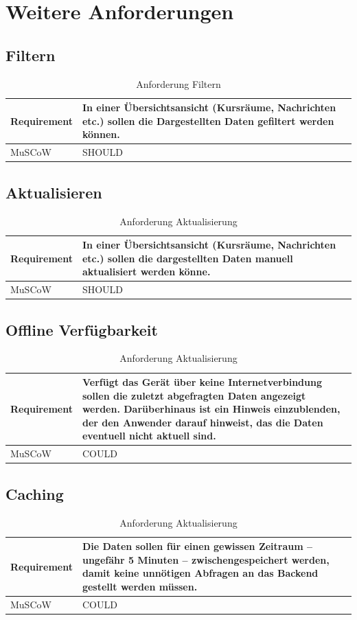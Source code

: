 \section{Weitere Anforderungen}
\subsection{Filtern}
  \begin{table}[H]
    \begin{tabular}{| a | p{12cm} |}
      \hline
      Requirement & In einer Übersichtsansicht (Kursräume, Nachrichten etc.) sollen die Dargestellten Daten gefiltert werden können. \\
      \hline
      MuSCoW & SHOULD
    \end{tabular}
  \caption{Anforderung Filtern}
  \label{requirement-filtering}
  \end{table}

\subsection{Aktualisieren}
  \begin{table}[H]
    \begin{tabular}{| a | p{12cm} |}
      \hline
      Requirement & In einer Übersichtsansicht (Kursräume, Nachrichten etc.) sollen die dargestellten Daten manuell aktualisiert werden könne. \\
      \hline
      MuSCoW & SHOULD
    \end{tabular}
  \caption{Anforderung Aktualisierung}
  \label{requirement-refresh}
  \end{table}

\subsection{Offline Verfügbarkeit}
  \begin{table}[H]
    \begin{tabular}{| a | p{12cm} |}
      \hline
      Requirement & Verfügt das Gerät über keine Internetverbindung sollen die zuletzt abgefragten Daten angezeigt werden. Darüberhinaus ist ein Hinweis einzublenden, der den Anwender darauf hinweist, das die Daten eventuell nicht aktuell sind. \\
      \hline
      MuSCoW & COULD
    \end{tabular}
  \caption{Anforderung Aktualisierung}
  \label{requirement-offline}
  \end{table}

\subsection{Caching}
  \begin{table}[H]
    \begin{tabular}{| a | p{12cm} |}
      \hline
      Requirement & Die Daten sollen für einen gewissen Zeitraum -- ungefähr 5 Minuten -- zwischengespeichert werden, damit keine unnötigen Abfragen an das Backend gestellt werden müssen. \\
      \hline
      MuSCoW & COULD
    \end{tabular}
  \caption{Anforderung Aktualisierung}
  \label{requirement-offline}
  \end{table}